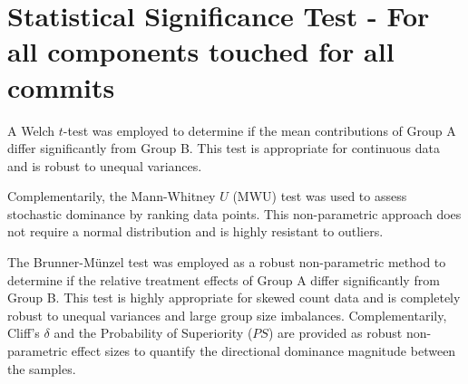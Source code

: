 \section{Statistical Significance Test - For all components touched for all commits} 
\label{sec:codebase_graph_latex.repository_graph.component_time_series.statistical_significance_test} 
A Welch $t$-test was employed to determine if the mean contributions of Group A differ significantly from Group B. This test is appropriate for continuous data and is robust to unequal variances. 
 
Complementarily, the Mann-Whitney $U$ (MWU) test was used to assess stochastic dominance by ranking data points. This non-parametric approach does not require a normal distribution and is highly resistant to outliers. 
 
The Brunner-Münzel test was employed as a robust non-parametric method to determine if the relative treatment effects of Group A differ significantly from Group B. This test is highly appropriate for skewed count data and is completely robust to unequal variances and large group size imbalances. Complementarily, Cliff's $\delta$ and the Probability of Superiority ($PS$) are provided as robust non-parametric effect sizes to quantify the directional dominance magnitude between the samples. 
 
